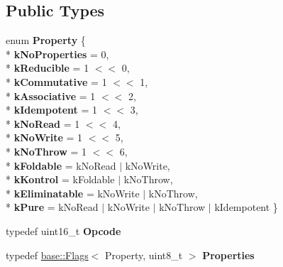 \subsection*{Public Types}
\begin{DoxyCompactItemize}
\item 
enum {\bfseries Property} \{ \\*
{\bfseries k\+No\+Properties} = 0, 
\\*
{\bfseries k\+Reducible} = 1 $<$$<$ 0, 
\\*
{\bfseries k\+Commutative} = 1 $<$$<$ 1, 
\\*
{\bfseries k\+Associative} = 1 $<$$<$ 2, 
\\*
{\bfseries k\+Idempotent} = 1 $<$$<$ 3, 
\\*
{\bfseries k\+No\+Read} = 1 $<$$<$ 4, 
\\*
{\bfseries k\+No\+Write} = 1 $<$$<$ 5, 
\\*
{\bfseries k\+No\+Throw} = 1 $<$$<$ 6, 
\\*
{\bfseries k\+Foldable} = k\+No\+Read $\vert$ k\+No\+Write, 
\\*
{\bfseries k\+Kontrol} = k\+Foldable $\vert$ k\+No\+Throw, 
\\*
{\bfseries k\+Eliminatable} = k\+No\+Write $\vert$ k\+No\+Throw, 
\\*
{\bfseries k\+Pure} = k\+No\+Read $\vert$ k\+No\+Write $\vert$ k\+No\+Throw $\vert$ k\+Idempotent
 \}\hypertarget{classv8_1_1internal_1_1compiler_1_1_operator_a46a45dbac84017b87c0432803df4c3ef}{}\label{classv8_1_1internal_1_1compiler_1_1_operator_a46a45dbac84017b87c0432803df4c3ef}

\item 
typedef uint16\+\_\+t {\bfseries Opcode}\hypertarget{classv8_1_1internal_1_1compiler_1_1_operator_a724184f5fca57dc0399824a2aa482f8d}{}\label{classv8_1_1internal_1_1compiler_1_1_operator_a724184f5fca57dc0399824a2aa482f8d}

\item 
typedef \hyperlink{classv8_1_1base_1_1_flags}{base\+::\+Flags}$<$ Property, uint8\+\_\+t $>$ {\bfseries Properties}\hypertarget{classv8_1_1internal_1_1compiler_1_1_operator_a55dce20c11e09a5294d6bfdceb9ababa}{}\label{classv8_1_1internal_1_1compiler_1_1_operator_a55dce20c11e09a5294d6bfdceb9ababa}

\end{DoxyCompactItemize}
